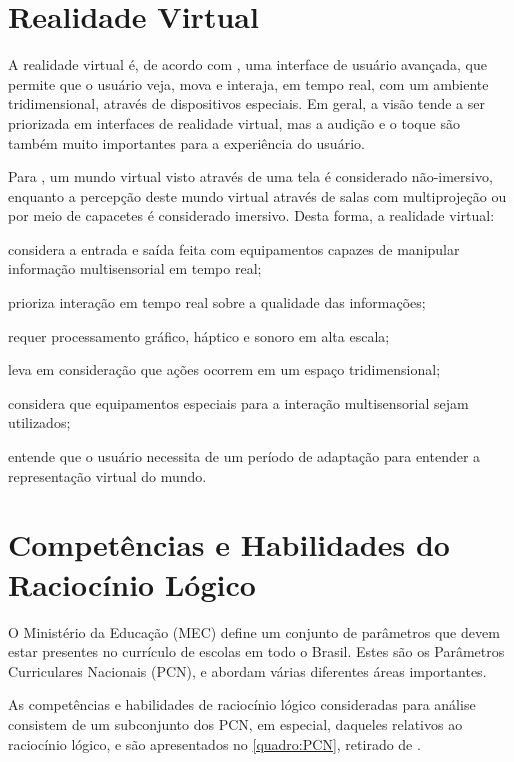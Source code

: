 \section{Realidade Virtual}\label{sec-realidadevirtual}

A realidade virtual é, de acordo com \cite{kirner:2007:RV_e_RA}, uma interface de
usuário avançada, que permite que o usuário veja, mova e interaja, em tempo real, 
com um ambiente tridimensional, através de dispositivos especiais. Em geral, a visão
tende a ser priorizada em interfaces de realidade virtual, mas a audição e o toque 
são também muito importantes para a experiência do usuário.

Para \cite{kirner:2011:evolucao_RV}, um mundo virtual visto através de uma tela é
considerado não-imersivo, enquanto a percepção deste mundo virtual através de salas 
com multiprojeção ou por meio de capacetes é considerado imersivo. Desta forma, a
realidade virtual:

\begin{alineas}
	\item considera a entrada e saída feita com equipamentos capazes de manipular 
	informação multisensorial em tempo real;
	\item prioriza interação em tempo real sobre a qualidade das informações;
	\item requer processamento gráfico, háptico e sonoro em alta escala;
	\item leva em consideração que ações ocorrem em um espaço tridimensional;
	\item considera que equipamentos especiais para a interação multisensorial sejam
	utilizados;
	\item entende que o usuário necessita de um período de adaptação para entender a
	representação virtual do mundo.
\end{alineas}

\section{Competências e Habilidades do Raciocínio Lógico}\label{sec-competenciashabilidades}

O Ministério da Educação (MEC) define um conjunto de parâmetros que devem estar
presentes no currículo de escolas em todo o Brasil. Estes são os Parâmetros
Curriculares Nacionais (PCN), e abordam várias diferentes áreas importantes. 

As competências e habilidades de raciocínio lógico consideradas para análise
consistem de um subconjunto dos PCN, em especial, daqueles relativos ao 
raciocínio lógico, e são apresentados no \autoref{quadro:PCN}, retirado de
\cite{Tabuti:2015:tabela_habilidades}.

